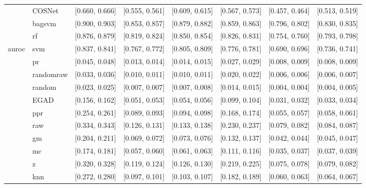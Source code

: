 \begin{table}[H]
{\begin{tabular}{llllllll}
 & COSNet & [0.660, 0.666] & [0.555, 0.561] & [0.609, 0.615] & [0.567, 0.573] & [0.457, 0.464] & [0.513, 0.519]\\

 & bagsvm & [0.900, 0.903] & [0.853, 0.857] & [0.879, 0.882] & [0.859, 0.863] & [0.796, 0.802] & [0.830, 0.835]\\

 & rf & [0.876, 0.879] & [0.819, 0.824] & [0.850, 0.854] & [0.826, 0.831] & [0.754, 0.760] & [0.793, 0.798]\\

\multirow{-15}{*}{\raggedright\arraybackslash auroc} & svm & [0.837, 0.841] & [0.767, 0.772] & [0.805, 0.809] & [0.776, 0.781] & [0.690, 0.696] & [0.736, 0.741]\\
\cmidrule{1-8}
 & pr & [0.045, 0.048] & [0.013, 0.014] & [0.014, 0.015] & [0.027, 0.029] & [0.008, 0.009] & [0.008, 0.009]\\

 & randomraw & [0.033, 0.036] & [0.010, 0.011] & [0.010, 0.011] & [0.020, 0.022] & [0.006, 0.006] & [0.006, 0.007]\\

 & random & [0.023, 0.025] & [0.007, 0.007] & [0.007, 0.008] & [0.014, 0.015] & [0.004, 0.004] & [0.004, 0.005]\\

 & EGAD & [0.156, 0.162] & [0.051, 0.053] & [0.054, 0.056] & [0.099, 0.104] & [0.031, 0.032] & [0.033, 0.034]\\

 & ppr & [0.254, 0.261] & [0.089, 0.093] & [0.094, 0.098] & [0.168, 0.174] & [0.055, 0.057] & [0.058, 0.061]\\

 & raw & [0.334, 0.343] & [0.126, 0.131] & [0.133, 0.138] & [0.230, 0.237] & [0.079, 0.082] & [0.084, 0.087]\\

 & gm & [0.204, 0.211] & [0.069, 0.072] & [0.073, 0.076] & [0.132, 0.137] & [0.042, 0.044] & [0.045, 0.047]\\

 & mc & [0.174, 0.181] & [0.057, 0.060] & [0.061, 0.063] & [0.111, 0.116] & [0.035, 0.037] & [0.037, 0.039]\\

 & z & [0.320, 0.328] & [0.119, 0.124] & [0.126, 0.130] & [0.219, 0.225] & [0.075, 0.078] & [0.079, 0.082]\\

 & knn & [0.272, 0.280] & [0.097, 0.101] & [0.103, 0.107] & [0.182, 0.189] & [0.060, 0.063] & [0.064, 0.067]\\


\end{tabular}}
\end{table}
